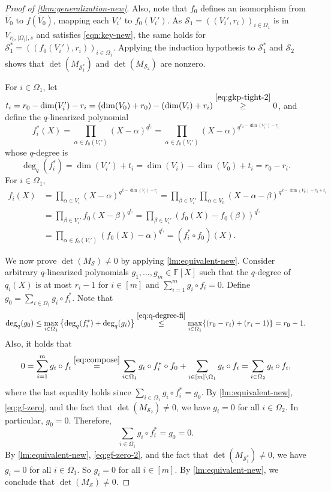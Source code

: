 \documentclass[11pt]{article}
\theoremstyle{plain}
\theoremstyle{definition}
\theoremstyle{remark}
\newcommand{\cS}{\mathcal{S}}
\begin{document}
\begin{proof}[Proof of \cref{thm:generalization-new}]
Also, note that $f_0$ defines an isomorphism from $\overline{V}_0$ to $f(\overline{V}_0)$, mapping each $V_i'$ to $f_0(V_i')$.
As $\cS_1=((V_i', r_i))_{i\in \Omega_1}$ is in $V_{r_0,|\Omega_1|,s}$ and satisfies \eqref{eqn:key-new}, the same holds for $\cS_1^*=((f_0(V_i'), r_i))_{i\in \Omega_1}$.
Applying the induction hypothesis to $\cS_1^*$ and $\cS_2$ shows that $\det(M_{\cS_1^*})$ and $\det(M_{\cS_2})$ are nonzero.

For $i\in \Omega_1$, 
let $t_i
=r_0-\dim(V_i')-r_i
=(\dim (V_0)+r_0)-(\dim (V_i)+r_i)
\stackrel{\eqref{eq:gkp-tight-2}}{\geq} 0$, and define the $q$-linearized polynomial
\[
f_i^*(X)=\prod_{\alpha\in f_0(V_i')}(X-\alpha)^{q^{t_i}}=\prod_{\alpha\in f_0(V_i')}(X-\alpha)^{q^{r_0-\dim(V_i')-r_i}}
\]
whose $q$-degree is
\begin{equation}\label{eq:q-degree-fi}
\deg_q(f_i^*)=\dim(V_i')+t_i=\dim(V_i)-\dim(V_0)+t_i=r_0-r_i.
\end{equation}
For $i\in\Omega_1$,
\begin{equation}\label{eq:compose}
\begin{aligned}
f_i(X)&=\prod_{\alpha\in V_i}(X-\alpha)^{q^{k-\dim(V_i)-r_i}}
=\prod_{\beta\in V_i'}\prod_{\alpha\in V_0}(X-\alpha-\beta)^{q^{k-\dim(V_0)-r_0+t_i}}\\
&=\prod_{\beta\in V_i'} f_0(X-\beta)^{q^{t_i}}
=\prod_{\beta\in V_i'} (f_0(X)-f_0(\beta))^{q^{t_i}}\\
&=\prod_{\alpha\in f_0(V_i')} (f_0(X)-\alpha)^{q^{t_i}}=(f_i^* \circ f_0)(X).
\end{aligned}
\end{equation}

We now prove $\det(M_{\cS})\neq 0$ by applying \cref{lm:equivalent-new}. Consider arbitrary $q$-linearized polynomials $g_1,\dots,g_m\in \mathbb{F}[X]$ such that the $q$-degree of $q_i(X)$ is at most $r_i-1$ for $i\in [m]$ and $\sum_{i=1}^m g_i\circ f_i=0$. 
Define $g_0=\sum_{i\in \Omega_1}g_i\circ f_i^*$. 
Note that 
\[
\deg_q (g_0)
\leq \max_{i\in \Omega_1} \left\{\deg_q (f_i^*)+\deg_q (g_i)\right\}
\stackrel{\eqref{eq:q-degree-fi}}{\leq} \max_{i\in \Omega_1} \{(r_0-r_i)+(r_i-1)\}=r_0-1.
\]
Also, it holds that 
\begin{equation}\label{eq:gf-zero}
0=\sum_{i=1}^m g_i\circ f_i\stackrel{\eqref{eq:compose}}{=}\sum_{i\in \Omega_1}g_i\circ f_i^*\circ f_0+\sum_{i\in [m]\setminus \Omega_1} g_i\circ f_i=\sum_{i\in \Omega_2}g_i\circ f_i,
\end{equation}
where the last equality holds since 
$\sum_{i\in \Omega_1}g_i\circ f_i^*=g_0$.
By \cref{lm:equivalent-new}, \eqref{eq:gf-zero}, and the fact that $\det(M_{\cS_2})\neq 0$, we have $g_i=0$ for all $i\in \Omega_2$. In particular, $g_0=0$.
Therefore,
\begin{equation}\label{eq:gf-zero-2}
\sum_{i\in \Omega_1}g_i\circ f_i^*=g_0=0.
\end{equation}
By \cref{lm:equivalent-new}, \eqref{eq:gf-zero-2}, and the fact that $\det(M_{\cS_1^*})\neq 0$, we have $g_i=0$ for all $i\in \Omega_1$.
So $g_i=0$ for all $i\in [m]$. 
By \cref{lm:equivalent-new}, we conclude that $\det(M_{\cS})\neq 0$.


\end{proof}
\end{document}
